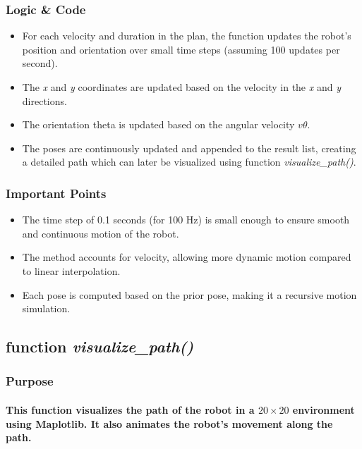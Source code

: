 \documentclass[12pt, letterpaper]{article}
\begin{document}
\subsubsection{Logic \& Code}
\begin{itemize}
    \item{For each velocity and duration in the plan, the function updates the robot's position and orientation over small time steps (assuming 100 updates per second).}
    \item{The \textit{x} and \textit{y} coordinates are updated based on the velocity in the \textit{x} and \textit{y} directions.}
    \item{The orientation theta is updated based on the angular velocity $v\theta$.}
    \item{The poses are continuously updated and appended to the result list, creating a detailed path which can later be visualized using function \textit{visualize\_path()}.}
\end{itemize}
\subsubsection{Important Points}
\begin{itemize}
    \item{The time step of 0.1 seconds (for 100 Hz) is small enough to ensure smooth and continuous motion of the robot.}
    \item{The method accounts for velocity, allowing more dynamic motion compared to linear interpolation.}
    \item{Each pose is computed based on the prior pose, making it a recursive motion simulation.}
\end{itemize}
\subsection{function \textit{visualize\_path()}}
\subsubsection{Purpose}
\paragraph{This function visualizes the path of the robot in a $20 \times 20$ environment using Maplotlib. It also animates the robot's movement along the path.}
\end{document}
